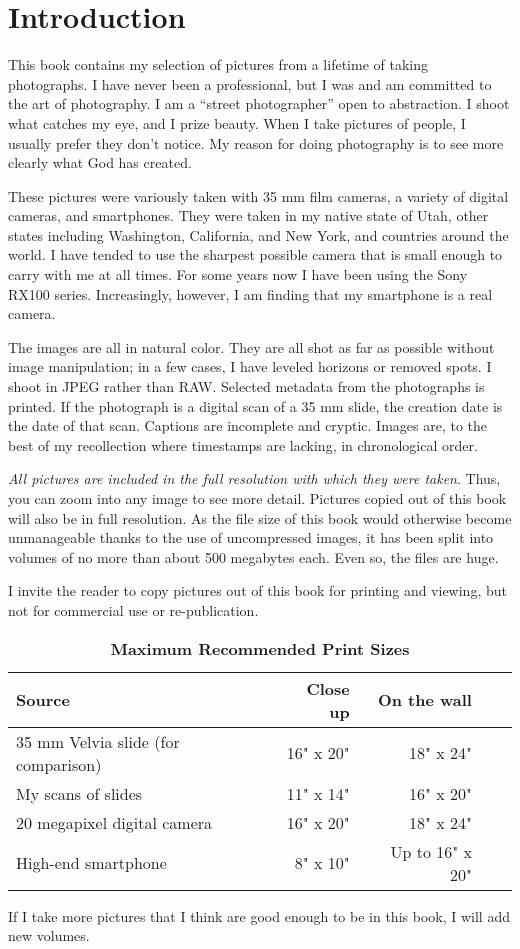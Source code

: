 \chapter{Introduction}

This book contains my selection of pictures from a lifetime of taking photographs. I have never been a professional, but I was and am committed to the art of photography. I am a ``street photographer'' open to abstraction. I shoot what catches my eye, and I prize beauty. When I take pictures of people, I usually prefer they don't notice. My reason for doing photography is to see more clearly what God has created.

These pictures were variously taken with 35 mm film cameras, a variety of digital cameras, and smartphones. They were taken in my native state of Utah, other states including Washington, California, and New York, and countries around the world. I have tended to use the sharpest possible camera that is small enough to carry with me at all times. For some years now I have been using the Sony RX100 series. Increasingly, however, I am finding that my smartphone is a real camera.

The images are all in natural color. They are all shot as far as possible without image manipulation; in a few cases, I have leveled horizons or removed spots. I shoot in JPEG rather than RAW. Selected metadata from the photographs is printed. If the photograph is a digital scan of a 35 mm slide, the creation date is the date of that scan. Captions are incomplete and cryptic. Images are, to the best of my recollection where timestamps are lacking, in chronological order.

\emph{All pictures are included in the full resolution with which they were taken}. Thus, you can zoom into any image to see more detail. Pictures copied out of this book will also be in full resolution. As the file size of this book would otherwise become unmanageable thanks to the use of uncompressed images, it has been split into volumes of no more than about 500 megabytes each. Even so, the files are huge.

I invite the reader to copy pictures out of this book for printing and viewing, but not for commercial use or re-publication. 

\begin{table}[h]
\centering
\captionsetup{labelformat=empty}
\caption{\textbf{Maximum Recommended Print Sizes}}
\begin{tabular}{lrrrr}
\hline
Source                       & Close up & On the wall & \\
\hline
35 mm Velvia slide (for comparison) & 16" x 20" & 18" x 24" &  \\
My scans of slides                            & 11" x 14"  & 16" x 20"  & \\
20 megapixel digital camera             & 16" x 20"  & 18" x 24"  & \\
High-end smartphone                      & 8" x 10"   & Up to 16" x 20"  & \\
\hline
\end{tabular}
\end{table}

If I take more pictures that I think are good enough to be in this book, I will add new volumes.

